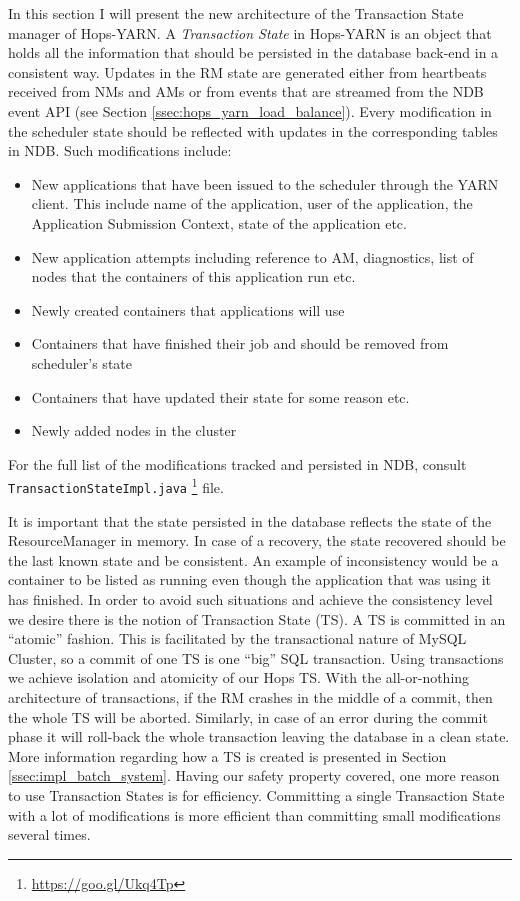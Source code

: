 In this section I will present the new architecture of the Transaction
State manager of Hops-YARN. A \emph{Transaction State} in Hops-YARN is
an object that holds all the information that should be persisted in
the database back-end in a consistent way. Updates in the RM state are
generated either from heartbeats received from NMs and AMs or from
events that are streamed from the NDB event API (see Section
\ref{ssec:hops_yarn_load_balance}). Every modification in the
scheduler state should be reflected with updates in the corresponding
tables in NDB. Such modifications include:
\begin{itemize}
\item New applications that have been issued to the scheduler through
the YARN client. This include name of the application, user of
the application, the Application Submission Context, state of the
application etc.

\item New application attempts including reference to AM,
diagnostics, list of nodes that the containers of this application run
etc.

\item Newly created containers that applications will use

\item Containers that have finished their job and should be removed
from scheduler's state

\item Containers that have updated their state for some reason etc.

\item Newly added nodes in the cluster
\end{itemize}

For the full list of the modifications tracked and persisted in NDB,
consult \texttt{TransactionStateImpl.java}
\footnote{\url{https://goo.gl/Ukq4Tp}} file.

It is important that the state persisted in the database reflects the
state of the ResourceManager in memory. In case of a recovery, the
state recovered should be the last known state and be consistent. An
example of inconsistency would be a container to be listed as running
even though the application that was using it has finished. In order to
avoid such situations and achieve the consistency level we desire
there is the notion of Transaction State (TS). A TS is committed in an
``atomic'' fashion. This is facilitated by the transactional nature of
MySQL Cluster, so a commit of one TS is one ``big'' SQL
transaction. Using transactions we achieve isolation and atomicity of
our Hops TS. With the all-or-nothing architecture of transactions, if
the RM crashes in the middle of a commit, then the whole TS will be
aborted. Similarly, in case of an error during the commit phase it will
roll-back the whole transaction leaving the database in a clean state.
More information regarding how a TS is created is presented in Section
\ref{ssec:impl_batch_system}. Having our safety property covered, one
more reason to use Transaction States is for efficiency. Committing a
single Transaction State with a lot of modifications is more efficient
than committing small modifications several times.

